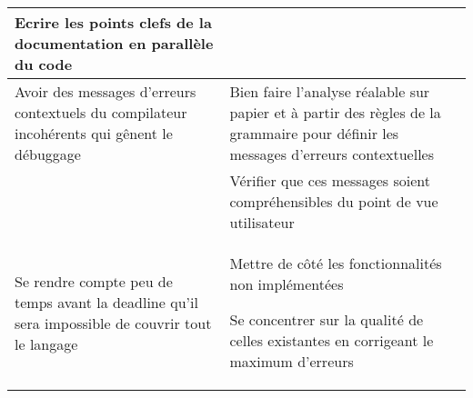 \documentclass[a4paper,11pt]{article}
\begin{document}
\begin{enumerate}
\begin{center}
\begin{tabular}{p{6cm} | p{7.5cm}}
Ecrire les points clefs de la documentation en parallèle du code \\
\hline
Avoir des messages d'erreurs contextuels du compilateur incohérents qui gênent le débuggage & Bien faire l'analyse réalable sur papier et à partir des règles de la grammaire pour définir les messages d'erreurs contextuelles \\
 & Vérifier que ces messages soient compréhensibles du point de vue utilisateur \\
\hline
Se rendre compte peu de temps avant la deadline qu'il sera impossible de couvrir tout le langage & Mettre de côté les fonctionnalités non implémentées

Se concentrer sur la qualité de celles existantes en corrigeant le maximum d'erreurs\\
\end{tabular}
\end{center}
\end{enumerate}
\end{document}
